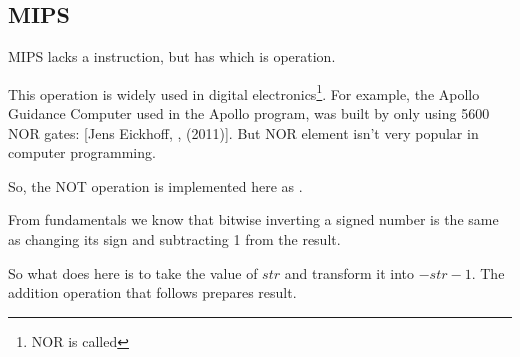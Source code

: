 ﻿\subsection{MIPS}




MIPS lacks a \NOT instruction, but has \NOR which is  operation.

This operation is widely used in digital electronics\footnote{NOR is called }.
For example, the Apollo Guidance Computer used in the Apollo program, 
was built by only using 5600 NOR gates:
[Jens Eickhoff, , (2011)].
But NOR element isn't very popular in computer programming.

So, the NOT operation is implemented here as .

From fundamentals  we know that bitwise inverting a signed number is the same 
as changing its sign and subtracting 1 from the result.

So what \NOT does here is to take the value of $str$ and transform it into $-str-1$.
The addition operation that follows prepares result.

